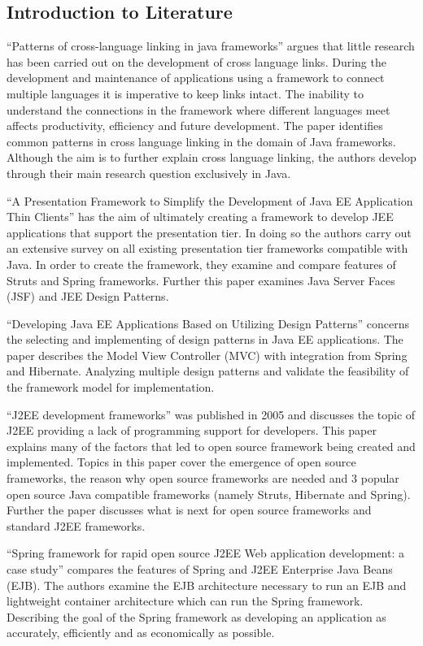 \documentclass{article}
\begin{document}
	\subsection{Introduction to Literature}
	“Patterns of cross-language linking in java frameworks” argues that little research has been carried out on the development of cross language links. During the development and maintenance of applications using a framework to connect multiple languages it is imperative to keep links intact. The inability to understand the connections in the framework where different languages meet affects productivity, efficiency and future development. The paper identifies common patterns in cross language linking in the domain of Java frameworks. Although the aim is to further explain cross language linking, the authors develop through their main research question exclusively in Java.
	
	“A Presentation Framework to Simplify the Development of Java EE Application Thin Clients” has the aim of ultimately creating a framework to develop JEE applications that support the presentation tier. In doing so the authors carry out an extensive survey on all existing presentation tier frameworks compatible with Java. In order to create the framework, they examine and compare features of Struts and Spring frameworks. Further this paper examines Java Server Faces (JSF) and JEE Design Patterns.
	
	“Developing Java EE Applications Based on Utilizing Design Patterns” concerns the selecting and implementing of design patterns in Java EE applications. The paper describes the Model View Controller (MVC) with integration from Spring and Hibernate. Analyzing multiple design patterns and validate the feasibility of the framework model for implementation.
	
	“J2EE development frameworks” was published in 2005 and discusses the topic of J2EE providing a lack of programming support for developers. This paper explains many of the factors that led to open source framework being created and implemented. Topics in this paper cover the emergence of open source frameworks, the reason why open source frameworks are needed and 3 popular open source Java compatible frameworks (namely Struts, Hibernate and Spring). Further the paper discusses what is next for open source frameworks and standard J2EE frameworks.

	“Spring framework for rapid open source J2EE Web application development: a case study” compares the features of Spring and J2EE Enterprise Java Beans (EJB). The authors examine the EJB architecture necessary to run an EJB and lightweight container architecture which can run the Spring framework. Describing the goal of the Spring framework as developing an application as accurately, efficiently and as economically as possible.
\end{document}
